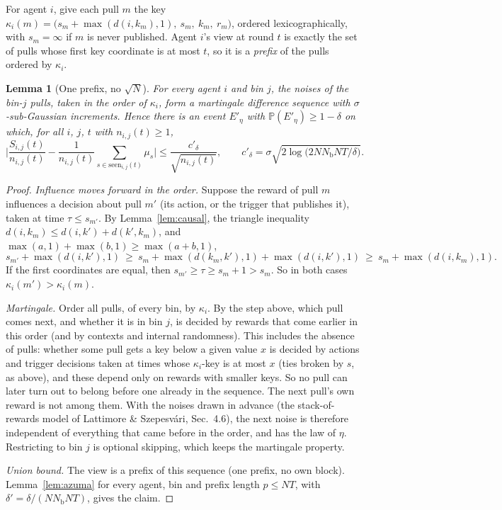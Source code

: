 \documentclass[11pt]{article}
\newtheorem{lemma}[theorem]{Lemma}
\theoremstyle{definition}
\newcommand{\Prob}{\mathbb{P}}
\newcommand{\Nb}{N_{\mathrm b}}
\begin{document}
For agent $i$, give each pull $m$ the key $\kappa_i(m)=\big(s_m+\max(d(i,k_m),1),\ s_m,\ k_m,\ r_m\big)$, ordered
lexicographically, with $s_m=\infty$ if $m$ is never published. Agent $i$'s view at round $t$ is exactly the set of
pulls whose first key coordinate is at most $t$, so it is a \emph{prefix} of the pulls ordered by $\kappa_i$.

\begin{lemma}[One prefix, no $\sqrt N$]\label{lem:pubconf}
For every agent $i$ and bin $j$, the noises of the bin-$j$ pulls, taken in the order of $\kappa_i$, form a martingale
difference sequence with $\sigma$-sub-Gaussian increments. Hence there is an event $E'_\eta$ with
$\Prob(E'_\eta)\ge1-\delta$ on which, for all $i$, $j$, $t$ with $n_{i,j}(t)\ge1$,
\[
\Big|\frac{S_{i,j}(t)}{n_{i,j}(t)}-\frac1{n_{i,j}(t)}\sum_{s\in\mathrm{seen}_{i,j}(t)}\mu_s\Big|\le\frac{c'_\delta}{\sqrt{n_{i,j}(t)}},
\qquad c'_\delta=\sigma\sqrt{2\log\big(2N\Nb NT/\delta\big)} .
\]
\end{lemma}
\begin{proof}
\emph{Influence moves forward in the order.} Suppose the reward of pull $m$ influences a decision about pull $m'$ (its
action, or the trigger that publishes it), taken at time $\tau\le s_{m'}$. By Lemma~\ref{lem:causal}, the triangle
inequality $d(i,k_m)\le d(i,k')+d(k',k_m)$, and $\max(a,1)+\max(b,1)\ge\max(a+b,1)$,
\[
s_{m'}+\max(d(i,k'),1)\ \ge\ s_m+\max(d(k_m,k'),1)+\max(d(i,k'),1)\ \ge\ s_m+\max(d(i,k_m),1).
\]
If the first coordinates are equal, then $s_{m'}\ge\tau\ge s_m+1>s_m$. So in both cases $\kappa_i(m')>\kappa_i(m)$.

\emph{Martingale.} Order all pulls, of every bin, by $\kappa_i$. By the step above, which pull comes next, and whether
it is in bin $j$, is decided by rewards that come earlier in this order (and by contexts and internal randomness).
This includes the absence of pulls: whether some pull gets a key below a given value $x$ is decided by actions and
trigger decisions taken at times whose $\kappa_i$-key is at most $x$ (ties broken by $s$, as above), and these depend
only on rewards with smaller keys. So no pull can later turn out to belong before one already in the sequence.
The next pull's own reward is not among them. With the noises drawn in advance (the stack-of-rewards model of
Lattimore \& Szepesv\'ari, Sec.~4.6), the next noise is therefore independent of everything that came before in the
order, and has the law of $\eta$. Restricting to bin $j$ is optional skipping, which keeps the martingale property.

\emph{Union bound.} The view is a prefix of this sequence (one prefix, no own block). Lemma~\ref{lem:azuma} for every
agent, bin and prefix length $p\le NT$, with $\delta'=\delta/(N\Nb NT)$, gives the claim.
\end{proof}
\end{document}
